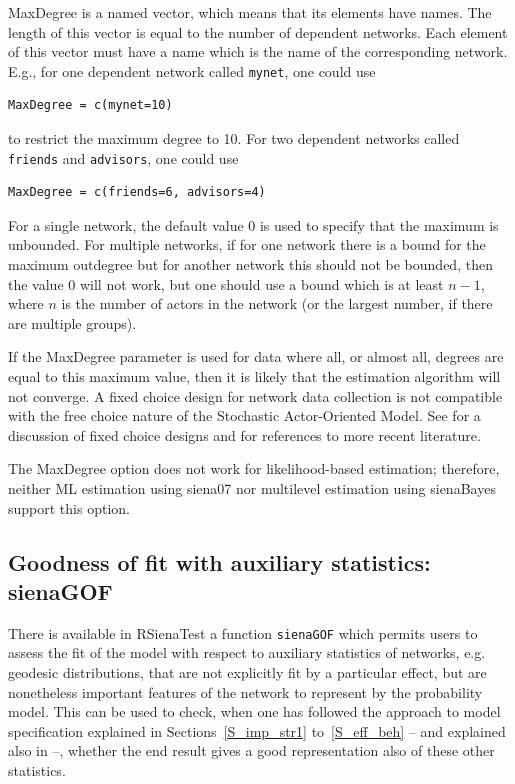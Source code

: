 \documentclass[a4paper,fleqn,11pt]{article}
\newcommand{\+}{\, + \,}
\newcommand{\sfn}[1]{\textsf{#1}}
\newcommand{\saom}{{Stochastic Actor-Oriented Model}}
\begin{document}
\textsf{MaxDegree} is a named vector, which means that its elements
have names. The length of this vector
is equal to the number of dependent networks.
Each element of this vector must have a name
which is the name of the corresponding network.
E.g., for one dependent network called \texttt{mynet}, one could use
\begin{verbatim}
MaxDegree = c(mynet=10)
\end{verbatim}
to restrict the maximum degree to 10.
For two dependent networks called \texttt{friends} and \texttt{advisors},
one could use
\begin{verbatim}
MaxDegree = c(friends=6, advisors=4)
\end{verbatim}

For a single network, the default value 0 is used
to specify that the maximum is unbounded.
For multiple networks, if for one network
there is a bound for the maximum outdegree
 but for another network this should not be bounded, then
 the value 0 will not work,
 but one should use a bound which is at least $n-1$,
where $n$ is the number of actors in the network (or the largest number,
if there are multiple groups).

If the \textsf{MaxDegree} parameter is used for data where
all, or almost all, degrees are equal to this maximum value,
then it is likely that the estimation algorithm will not converge.
A fixed choice design for network data collection is not
compatible with the free choice nature of the \saom.
See \citet{HollandLeinhardt1973} for a discussion of
fixed choice designs and \citet{Znidarsic2012}
for references to more recent literature.

The \textsf{MaxDegree} option does not work for likelihood-based
estimation; therefore, neither ML estimation using \textsf{siena07}
nor multilevel estimation using \textsf{sienaBayes} support
this option.


\subsection{Goodness of fit with auxiliary statistics: \sfn{sienaGOF}}
\label{S_gof}

There is available in RSienaTest a function \verb!sienaGOF!
which permits users to assess the fit of the model with respect to
auxiliary statistics of networks, e.g. geodesic distributions,
that are not explicitly fit by a particular effect,
but are nonetheless important features of the network to represent by the
probability model.
This can be used to check, when one has followed the approach to
model specification explained in Sections~\ref{S_imp_str1}
to~\ref{S_eff_beh} -- and explained also in \citet{SnijdersEA10b} --,
whether the end result gives a good representation
also of these other statistics.
\end{document}
